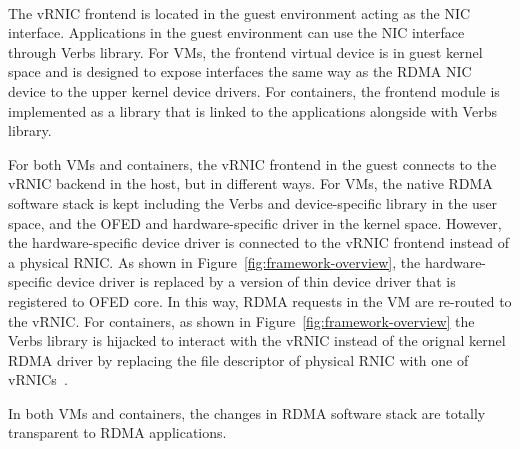 \
\noindent

The vRNIC frontend is located in the guest environment acting as the NIC interface. Applications in the guest environment can use the NIC interface through Verbs library. For VMs, the frontend virtual device is in guest kernel space and is designed to expose interfaces the same way as the RDMA NIC device to the upper kernel device drivers. For containers, the frontend module is implemented as a library that is linked to the applications alongside with Verbs library.


For both VMs and containers, the vRNIC frontend in the guest connects to the vRNIC backend in the host, but in different ways.
For VMs, the native RDMA software stack is kept including the Verbs and device-specific library in the user space, and the OFED and hardware-specific driver in the kernel space. However, the hardware-specific device driver is connected to the vRNIC frontend instead of a physical RNIC. As shown in Figure~\ref{fig:framework-overview}, the hardware-specific device driver is replaced by a \sys version of thin device driver that is registered to OFED core. In this way, RDMA requests in the VM are re-routed to the vRNIC.
For containers, as shown in Figure~\ref{fig:framework-overview} the Verbs library is hijacked to interact with the vRNIC instead of the orignal kernel RDMA driver by replacing the file descriptor of physical RNIC with one of vRNICs~\cite{kim2019freeflow}.

In both VMs and containers, the changes in RDMA software stack are totally transparent to RDMA applications.


